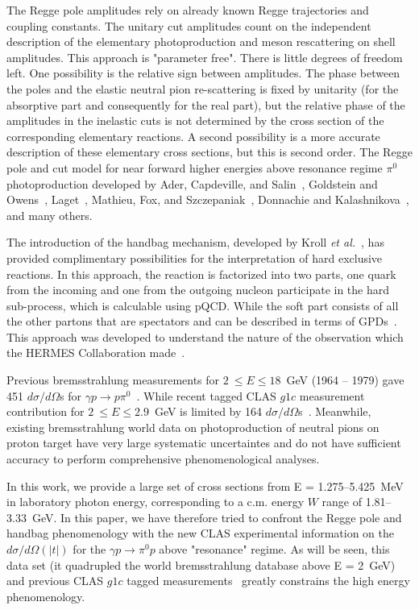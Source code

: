 \documentclass[aps,prc,onecolumn,floatfix,showpacs,preprintnumbers,amsmath,amssymb,superscriptaddress]{revtex4-1}
\begin{document}
The Regge pole amplitudes rely on already known Regge 
trajectories and coupling constants. The unitary cut amplitudes 
count on the independent description of the elementary 
photoproduction and meson rescattering on shell amplitudes.  
This approach is "parameter free". There is little degrees of 
freedom left. One possibility is the relative sign between 
amplitudes. The phase between the poles and the elastic neutral 
pion re-scattering is fixed by unitarity (for the absorptive 
part and consequently for the real part), but the relative 
phase of the amplitudes in the inelastic cuts is not 
determined by the cross section of the corresponding elementary 
reactions. A second possibility is a more accurate description 
of these elementary cross sections, but this is second order.  
The Regge pole and cut model for near forward higher energies 
above resonance regime $\pi^0$ photoproduction developed by 
Ader, Capdeville, and Salin~\cite{Ader}, Goldstein and 
Owens~\cite{Goldstein}, Laget~\cite{Laget}, Mathieu, Fox, and 
Szczepaniak~\cite{Mathieu}, Donnachie and 
Kalashnikova~\cite{Donnachie}, and many others.

The introduction of the handbag mechanism, developed by Kroll 
\textit{et al.}~\cite{Kroll}, has provided complimentary 
possibilities for the interpretation of hard exclusive 
reactions. In this approach, the reaction is factorized into 
two parts, one quark from the incoming and one from the 
outgoing nucleon participate in the hard sub-process, which is 
calculable using pQCD. While the soft part consists of all the 
other partons that are spectators and can be described in 
terms of GPDs~\cite{HM}. This approach was developed to 
understand the nature of the observation which the HERMES 
Collaboration made~\cite{Moskov}.

Previous bremsstrahlung measurements for $2~\leq E\leq 
18$~GeV (1964 -- 1979) gave 451 $d\sigma/d\Omega$s for 
$\gamma p\to p\pi^0$~\cite{brem}.  While recent tagged CLAS 
$g1c$ measurement contribution for $2~\leq E\leq 2.9$~GeV 
is limited by 164 $d\sigma/d\Omega$s~\cite{du07}.  Meanwhile, 
existing bremsstrahlung world data on photoproduction of neutral 
pions on proton target have very large systematic uncertaintes 
and do not have sufficient accuracy to perform comprehensive 
phenomenological analyses.

In this work, we provide a large set of cross sections from 
E = 1.275--5.425~MeV in laboratory photon energy, corresponding 
to a c.m. energy $W$ range of 1.81--3.33~GeV.  In this paper, 
we have therefore tried to confront the Regge pole and handbag 
phenomenology with the new CLAS experimental information on the 
$d\sigma/d\Omega(|t|)$ for the $\gamma p\to\pi^0p$ above 
"resonance" regime. As will be seen, this data set (it 
quadrupled the world bremsstrahlung database above E = 2~GeV) 
and previous CLAS $g1c$ tagged measurements~\cite{du07} 
greatly constrains the high energy phenomenology.
\end{document}

